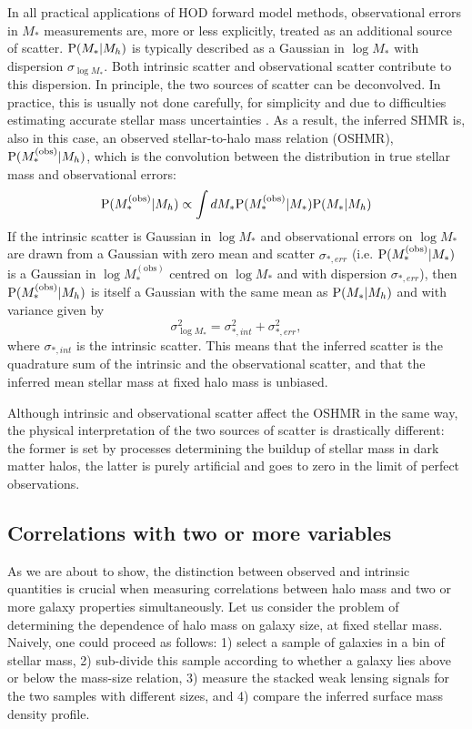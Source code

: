 \documentclass[usenatbib]{mnras}
\def\mobs{M_*^{\mathrm{(obs)}}}
\def\mstar{M_*}
\def\mhalo{M_{h}}
\def\pr{{\rm P}}
\begin{document}
In all practical applications of HOD forward model methods, observational errors in $M_*$ measurements are, more or less explicitly, treated as an additional source of scatter.
$\pr(\mstar | \mhalo)$ is typically described as a Gaussian in $\log{\mstar}$ with dispersion $\sigma_{\log{\mstar}}$. Both intrinsic scatter and observational scatter contribute to this dispersion. 
In principle, the two sources of scatter can be deconvolved. In practice, this is usually not done carefully, for simplicity and due to difficulties estimating accurate stellar mass uncertainties \citep[see discussion in subsection 4.2 of][]{Lea++12}. 
As a result, the inferred SHMR is, also in this case, an observed stellar-to-halo mass relation (OSHMR), $\pr(\mobs | \mhalo)$, which is the convolution between the distribution in true stellar mass and observational errors:
\begin{equation}
\pr(\mobs | \mhalo) \propto \int d\mstar \pr(\mobs | \mstar) \pr(\mstar | \mhalo) 
\end{equation}
%
If the intrinsic scatter is Gaussian in $\log{\mstar}$ and observational errors on $\log{\mstar}$ are drawn from a Gaussian with zero mean and scatter $\sigma_{*,err}$ (i.e. $\pr(\mobs | \mstar)$ is a Gaussian in $\log{\mobs}$ centred on $\log{\mstar}$ and with dispersion $\sigma_{*,err}$), then $\pr(\mobs | \mhalo)$ is itself a Gaussian with the same mean as $\pr(\mstar | \mhalo)$ and with variance given by
\begin{equation}
\sigma_{\log{\mstar}}^2 = \sigma_{*,int}^2 + \sigma_{*,err}^2,
\end{equation}
where $\sigma_{*,int}$ is the intrinsic scatter. 
This means that the inferred scatter is the quadrature sum of the intrinsic and the observational scatter, and that the inferred mean stellar mass at fixed halo mass is unbiased.

Although intrinsic and observational scatter affect the OSHMR in the same way, the physical interpretation of the two sources of scatter is drastically different: the former is set by processes determining the buildup of stellar mass in dark matter halos, the latter is purely artificial and goes to zero in the limit of perfect observations.

\subsection{Correlations with two or more variables}\label{ssec:introbias}

As we are about to show, the distinction between observed and intrinsic quantities is crucial when measuring correlations between halo mass and two or more galaxy properties simultaneously. 
Let us consider the problem of determining the dependence of halo mass on galaxy size, at fixed stellar mass. 
Naively, one could proceed as follows: 1) select a sample of galaxies in a bin of stellar mass, 2) sub-divide this sample according to whether a galaxy lies above or below the mass-size relation, 3) measure the stacked weak lensing signals for the two samples with different sizes, and 4) compare the inferred surface mass density profile.
\end{document}
